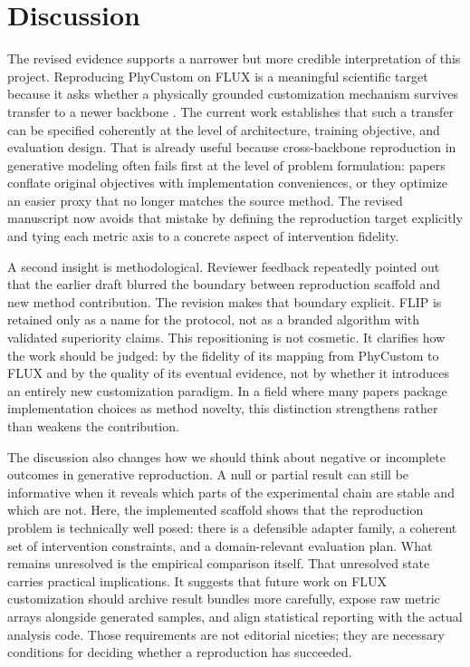 \documentclass{article}
\begin{document}
\section{Discussion}

The revised evidence supports a narrower but more credible interpretation of this project. Reproducing PhyCustom on FLUX is a meaningful scientific target because it asks whether a physically grounded customization mechanism survives transfer to a newer backbone \cite{wu2025phycustom,blackforestlabs2024fluxdev}. The current work establishes that such a transfer can be specified coherently at the level of architecture, training objective, and evaluation design. That is already useful because cross-backbone reproduction in generative modeling often fails first at the level of problem formulation: papers conflate original objectives with implementation conveniences, or they optimize an easier proxy that no longer matches the source method. The revised manuscript now avoids that mistake by defining the reproduction target explicitly and tying each metric axis to a concrete aspect of intervention fidelity.

A second insight is methodological. Reviewer feedback repeatedly pointed out that the earlier draft blurred the boundary between reproduction scaffold and new method contribution. The revision makes that boundary explicit. FLIP is retained only as a name for the protocol, not as a branded algorithm with validated superiority claims. This repositioning is not cosmetic. It clarifies how the work should be judged: by the fidelity of its mapping from PhyCustom to FLUX and by the quality of its eventual evidence, not by whether it introduces an entirely new customization paradigm. In a field where many papers package implementation choices as method novelty, this distinction strengthens rather than weakens the contribution.

The discussion also changes how we should think about negative or incomplete outcomes in generative reproduction. A null or partial result can still be informative when it reveals which parts of the experimental chain are stable and which are not. Here, the implemented scaffold shows that the reproduction problem is technically well posed: there is a defensible adapter family, a coherent set of intervention constraints, and a domain-relevant evaluation plan. What remains unresolved is the empirical comparison itself. That unresolved state carries practical implications. It suggests that future work on FLUX customization should archive result bundles more carefully, expose raw metric arrays alongside generated samples, and align statistical reporting with the actual analysis code. Those requirements are not editorial niceties; they are necessary conditions for deciding whether a reproduction has succeeded.
\end{document}
